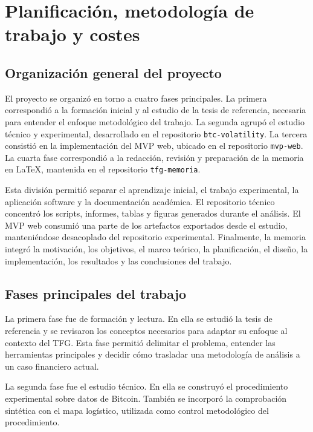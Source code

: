 
\chapter{Planificación, metodología de trabajo y costes}\label{cap:planificacion}

\section{Organización general del proyecto}\label{sec:organizacion-proyecto}

El proyecto se organizó en torno a cuatro fases principales. La primera correspondió a la formación inicial y al estudio de la tesis de referencia, necesaria para entender el enfoque metodológico del trabajo. La segunda agrupó el estudio técnico y experimental, desarrollado en el repositorio \texttt{btc-volatility}. La tercera consistió en la implementación del MVP web, ubicado en el repositorio \texttt{mvp-web}. La cuarta fase correspondió a la redacción, revisión y preparación de la memoria en \LaTeX{}, mantenida en el repositorio \texttt{tfg-memoria}.

Esta división permitió separar el aprendizaje inicial, el trabajo experimental, la aplicación software y la documentación académica. El repositorio técnico concentró los scripts, informes, tablas y figuras generados durante el análisis. El MVP web consumió una parte de los artefactos exportados desde el estudio, manteniéndose desacoplado del repositorio experimental. Finalmente, la memoria integró la motivación, los objetivos, el marco teórico, la planificación, el diseño, la implementación, los resultados y las conclusiones del trabajo.

\section{Fases principales del trabajo}\label{sec:fases-proyecto}

La primera fase fue de formación y lectura. En ella se estudió la tesis de referencia y se revisaron los conceptos necesarios para adaptar su enfoque al contexto del TFG. Esta fase permitió delimitar el problema, entender las herramientas principales y decidir cómo trasladar una metodología de análisis a un caso financiero actual.

La segunda fase fue el estudio técnico. En ella se construyó el procedimiento experimental sobre datos de Bitcoin. También se incorporó la comprobación sintética con el mapa logístico, utilizada como control metodológico del procedimiento.

